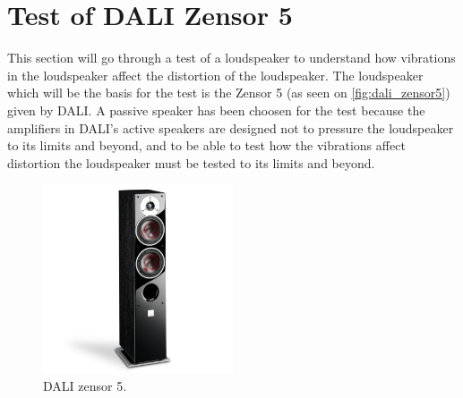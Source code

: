 \section{Test of DALI Zensor 5}
This section will go through a test of a loudspeaker to understand how vibrations in the loudspeaker affect the distortion of the loudspeaker.
The loudspeaker which will be the basis for the test is the Zensor 5 (as seen on \autoref{fig:dali_zensor5}) given by DALI. A passive speaker has been choosen for the test because the amplifiers in DALI's active speakers are designed not to pressure the loudspeaker to its limits and beyond, and to be able to test how the vibrations affect distortion the loudspeaker must be tested to its limits and beyond.

\begin{figure}[H]
\centering
\includegraphics[width=0.5\textwidth]{figures/zensor5.png}
\caption{DALI zensor 5.}
\label{fig:dali_zensor5}
\end{figure}



